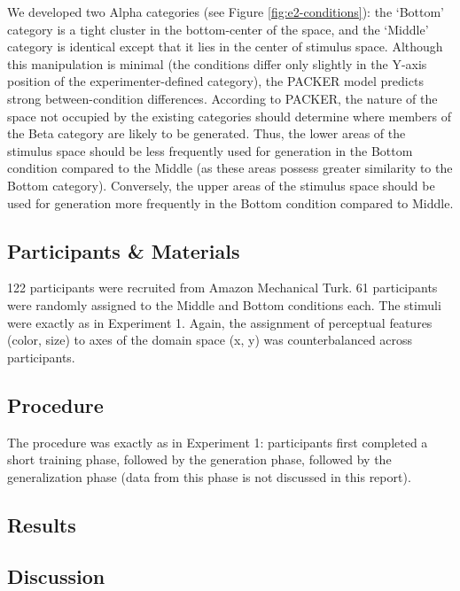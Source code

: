 \documentclass[12pt]{article}
\begin{document}
\begin{flushleft}
We developed two Alpha categories (see Figure \ref{fig:e2-conditions}): the `Bottom' category is a tight cluster in the bottom-center of the space, and the `Middle' category is identical except that it lies in the center of stimulus space. Although this manipulation is minimal (the conditions differ only slightly in the Y-axis position of the experimenter-defined category), the PACKER model predicts strong between-condition differences. According to PACKER, the nature of the space not occupied by the existing categories should determine where members of the Beta category are likely to be generated. Thus, the lower areas of the stimulus space should be less frequently used for generation in the Bottom condition compared to the Middle (as these areas possess greater similarity to the Bottom category). Conversely, the upper areas of the stimulus space should be used for generation more frequently in the Bottom condition compared to Middle.


\subsection{Participants \& Materials}

122 participants were recruited from Amazon Mechanical Turk. 61 participants were randomly assigned to the Middle and Bottom conditions each. The stimuli were exactly as in Experiment 1. Again, the assignment of perceptual features (color, size) to axes of the domain space (x, y) was counterbalanced across participants.

\subsection{Procedure}

The procedure was exactly as in Experiment 1: participants first completed a short training phase, followed by the generation phase, followed by the generalization phase (data from this phase is not discussed in this report).


\subsection{Results}

\subsection{Discussion}










\end{flushleft}
\end{document}
